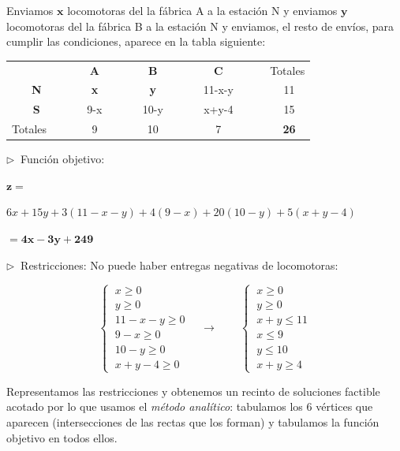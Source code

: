 Enviamos $\boldsymbol{x}$ locomotoras del la fábrica A a la estación N y enviamos $\boldsymbol{y}$ locomotoras del la fábrica B a la estación N y enviamos, el resto de envíos, para cumplir las condiciones, aparece en la tabla siguiente:

\begin{table}[H]
\centering
\begin{tabular}{cc|c|c|c}
                                & \textbf{A} & \textbf{B} & \textbf{C} &  $\quad$Totales \\ \cline{2-5} 
\multicolumn{1}{c|}{\textbf{N}} & \textbf{x} & \textbf{y} & 11-x-y     &  $\quad$ 11      \\ \hline
\multicolumn{1}{c|}{\textbf{S}} & $\quad$ 9-x    $\quad$     &  $\quad$ 10-y   $\quad$     &  $\quad$ x+y-4   $\quad$    &   $\quad$ 15      \\ \hline
\multicolumn{1}{c|}{Totales  $\quad$ }    & 9          & 10         & 7          &  $\quad$ \textbf{26}      \\ \cline{2-4}
\end{tabular}
\end{table}

$\triangleright \ $ Función objetivo:

$\boldsymbol{ z} = $\begin{small}${6x+15y+3(11-x-y)+4(9-x)+20(10-y)+5(x+y-4)}$\end{small}$= \boldsymbol{ 4x-3y+249}$

$\triangleright \ $ Restricciones: No puede haber entregas negativas de locomotoras:

$$\begin{cases}
\ x\ge 0 \\ \ y\ge 0 \\ \ 11-x-y\ge 0 \\ \ 9-x \ge 0 \\ \ 10-y \ge 0 \\ \ x+y-4 \ge 0  	
\end{cases} \quad \longrightarrow \qquad \begin{cases}
\ x\ge 0 \\ \ y\ge 0 \\ \ x+y\le 11 \\ \ x \le 9 \\ \ y \le 10 \\ \ x+y \ge 4 	
 \end{cases}$$

Representamos las restricciones y obtenemos un recinto de soluciones factible acotado por lo que usamos el \emph{método analítico}: tabulamos los 6 vértices que aparecen (intersecciones de las rectas que los forman) y tabulamos la función objetivo en todos ellos.


